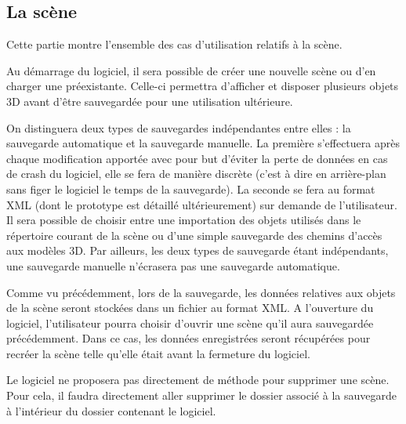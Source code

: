 \subsection{La scène}
Cette partie montre l’ensemble des cas d’utilisation relatifs à la scène.

\begin{description}[style=nextline]
    \item[Création de la scène]
    \mbox{\hspace{1cm}} Au démarrage du logiciel, il sera possible de créer une nouvelle scène ou d’en charger une préexistante. Celle-ci permettra d’afficher et disposer plusieurs objets 3D avant d’être sauvegardée pour une utilisation ultérieure.
    
    \item[Sauvegarde de la scène] 
    \mbox{\hspace{1cm}} On distinguera deux types de sauvegardes indépendantes entre elles : la sauvegarde automatique et la sauvegarde manuelle. La première s’effectuera après chaque modification apportée avec pour but d’éviter la perte de données en cas de crash du logiciel, elle se fera de manière discrète (c’est à dire en arrière-plan sans figer le logiciel le temps de la sauvegarde). La seconde se fera au format XML (dont le prototype est détaillé ultérieurement) sur demande de l’utilisateur. Il sera possible de choisir entre une importation des objets utilisés dans le répertoire courant de la scène ou d’une simple sauvegarde des chemins d’accès aux modèles 3D. Par ailleurs, les deux types de sauvegarde étant indépendants, une sauvegarde manuelle n’écrasera pas une sauvegarde automatique.
    
    \item[Chargement de la scène] 
    \mbox{\hspace{1cm}} Comme vu précédemment, lors de la sauvegarde, les données relatives aux objets de la scène seront stockées dans un fichier au format XML. A l’ouverture du logiciel, l’utilisateur pourra choisir d’ouvrir une scène qu’il aura sauvegardée précédemment. Dans ce cas, les données enregistrées seront récupérées pour recréer la scène telle qu’elle était avant la fermeture du logiciel.
    
    \item[Suppression de la scène]
    \mbox{\hspace{1cm}} Le logiciel ne proposera pas directement de méthode pour supprimer une scène. Pour cela, il faudra directement aller supprimer le dossier associé à la sauvegarde à l’intérieur du dossier contenant le logiciel.
    
\end{description}
	
